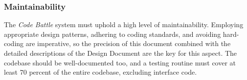 \subsubsection{Maintainability}
The \textit{Code Battle} system must uphold a high level of maintainability. Employing appropriate design patterns, adhering to coding standards, and avoiding hard-coding are imperative, so the precision of this document combined with the detailed descriptions of the Design Document are the key for this aspect. The codebase should be well-documented too, and a testing routine must cover at least 70 percent of the entire codebase, excluding interface code.

